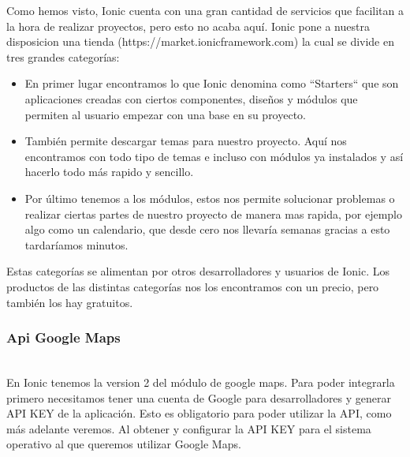\documentclass[a4paper, 11pt]{article}
\begin{document}
\begin{itemize}
                Como hemos visto, Ionic cuenta con una gran cantidad de servicios
                que facilitan a la hora de realizar proyectos, pero esto no acaba
                aquí. Ionic pone a nuestra disposicion una tienda
                (https://market.ionicframework.com) la cual se divide en tres
                grandes categorías:\\
                \begin{itemize}
                    \item{En primer lugar encontramos lo que Ionic denomina como
                    ``Starters`` que son aplicaciones creadas con ciertos componentes,
                    diseños y módulos que permiten al usuario empezar con una
                    base en su proyecto.}
                    \item{También permite descargar temas para nuestro proyecto.
                    Aquí nos encontramos con todo tipo de temas e incluso con
                    módulos ya instalados y así hacerlo todo más rapido
                    y sencillo.}
                    \item{Por último tenemos a los módulos, estos nos permite
                    solucionar problemas o realizar ciertas partes de nuestro proyecto
                    de manera mas rapida, por ejemplo algo como un calendario,
                    que desde cero nos llevaría semanas gracias a esto tardaríamos
                    minutos.}
                \end{itemize}

                Estas categorías se alimentan por otros desarrolladores y usuarios
                de Ionic. Los productos de las distintas categorías nos los
                encontramos con un precio, pero también los hay gratuitos.\\



            \subsubsection{Api Google Maps}\\

              En Ionic tenemos la version 2 del módulo de google maps. Para
              poder integrarla primero necesitamos tener una cuenta de Google
              para desarrolladores y generar API KEY de la aplicación. Esto es
              obligatorio para poder utilizar la API, como más adelante veremos.
              Al obtener y configurar la API KEY para el sistema operativo al
              que queremos utilizar Google Maps.\\


\end{itemize}
\end{document}
